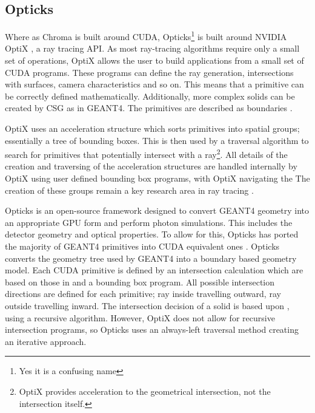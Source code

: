 \subsection{Opticks}
\par
Where as Chroma is built around CUDA, Opticks\footnote{Yes it is a confusing name} is built around NVIDIA OptiX \cite{nvidia_optix_paper_ref}, a ray tracing API.
As most ray-tracing algorithms require only a small set of operations, OptiX allows the user to build applications from a small set of CUDA programs.
These programs can define the ray generation, intersections with surfaces, camera characteristics and so on.
This means that a primitive can be correctly defined mathematically.
Additionally, more complex solids can be created by CSG as in GEANT4.
The primitives are described as boundaries \cite{real_time_collision_detection_ref}.
\par
OptiX uses an acceleration structure which sorts primitives into spatial groups; essentially a tree of bounding boxes.
This is then used by a traversal algorithm to search for primitives that potentially intersect with a ray\footnote{OptiX provides acceleration to the geometrical intersection, not the intersection itself.}.
All details of the creation and traversing of the acceleration structures are handled internally by OptiX using user defined bounding box programs, with OptiX navigating the 
The creation of these groups remain a key research area in ray tracing \cite{NVIDIA_OptiX_GPU_Ray_Tracing_ACM_paper_ref,accelerated_bvh_ref}.
\par
Opticks is an open-source framework designed to convert GEANT4 geometry into an appropriate GPU form and perform photon simulations.
This includes the detector geometry and optical properties.
To allow for this, Opticks has ported the majority of GEANT4 primitives into CUDA equivalent ones \cite{Opticks_CHEP_2019_ref}.
Opticks converts the geometry tree used by GEANT4 into a boundary based geometry model.
Each CUDA primitive is defined by an intersection calculation which are based on those in \cite{real_time_collision_detection_ref} and a bounding box program.
All possible intersection directions are defined for each primitive; ray inside travelling outward, ray outside travelling inward.
The intersection decision of a solid is based upon \cite{CSG_Intersection_ref}, using a recursive algorithm.
However, OptiX does not allow for recursive intersection programs, so Opticks uses an always-left traversal method creating an iterative approach.
\par
